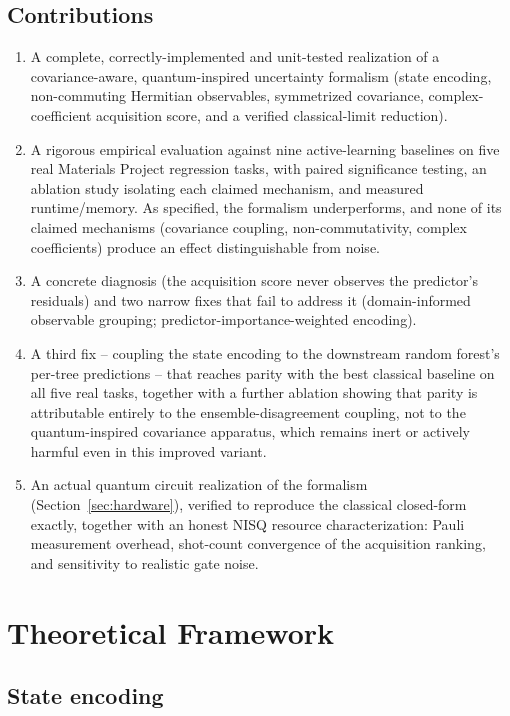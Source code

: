 \documentclass[conference]{IEEEtran}
\begin{document}
\subsection*{Contributions}
\begin{enumerate}
    \item A complete, correctly-implemented and unit-tested realization of a covariance-aware, quantum-inspired uncertainty formalism (state encoding, non-commuting Hermitian observables, symmetrized covariance, complex-coefficient acquisition score, and a verified classical-limit reduction).
    \item A rigorous empirical evaluation against nine active-learning baselines on five real Materials Project regression tasks, with paired significance testing, an ablation study isolating each claimed mechanism, and measured runtime/memory. As specified, the formalism underperforms, and none of its claimed mechanisms (covariance coupling, non-commutativity, complex coefficients) produce an effect distinguishable from noise.
    \item A concrete diagnosis (the acquisition score never observes the predictor's residuals) and two narrow fixes that fail to address it (domain-informed observable grouping; predictor-importance-weighted encoding).
    \item A third fix -- coupling the state encoding to the downstream random forest's per-tree predictions -- that reaches parity with the best classical baseline on all five real tasks, together with a further ablation showing that parity is attributable entirely to the ensemble-disagreement coupling, not to the quantum-inspired covariance apparatus, which remains inert or actively harmful even in this improved variant.
    \item An actual quantum circuit realization of the formalism (Section~\ref{sec:hardware}), verified to reproduce the classical closed-form exactly, together with an honest NISQ resource characterization: Pauli measurement overhead, shot-count convergence of the acquisition ranking, and sensitivity to realistic gate noise.
\end{enumerate}

\section{Theoretical Framework}\label{sec:method}

\subsection{State encoding}
\end{document}
